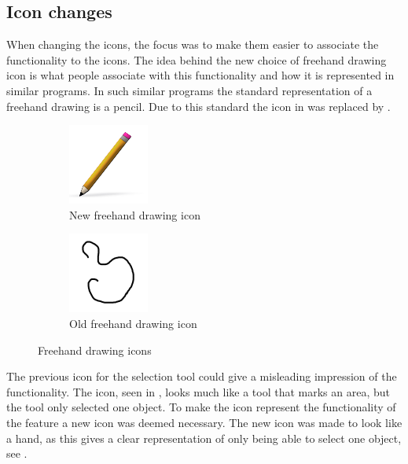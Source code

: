 \subsection{Icon changes}
When changing the icons, the focus was to make them easier to associate the functionality to the icons.
The idea behind the new choice of freehand drawing icon is what people associate with this functionality and how it is represented in similar programs.
In such similar programs the standard representation of a freehand drawing is a pencil.
Due to this standard the icon in  was replaced by .

\begin{figure}[h]
	\centering
	\begin{subfigure}[b]{0.45\textwidth}
		\centering
		\includegraphics[scale = 1]{media/freehandNew}
		\caption{New freehand drawing icon}
		\label{figure:new-freehand}
	\end{subfigure}
	\qquad
	\begin{subfigure}[b]{0.45\textwidth}
		\centering
		\includegraphics[scale = 0.1]{media/freehandOld}
		\caption{Old freehand drawing icon}
		\label{figure:old-freehand}
	\end{subfigure}
	\caption{Freehand drawing icons}
	\label{figure:freehand}
\end{figure}

The previous icon for the selection tool could give a misleading impression of the functionality.
The icon, seen in , looks much like a tool that marks an area, but the tool only selected one object.
To make the icon represent the functionality of the feature a new icon was deemed necessary.
The new icon was made to look like a hand, as this gives a clear representation of only being able to select one object, see .

